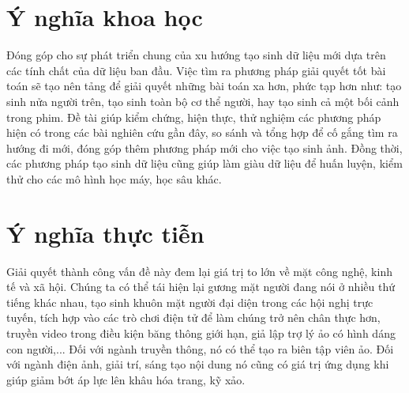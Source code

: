 \section{\texorpdfstring{Ý nghĩa khoa học}{ScientificMeaning}}
Đóng góp cho sự phát triển chung của xu hướng tạo sinh dữ liệu mới dựa trên các tính chất của dữ liệu ban đầu. Việc tìm ra phương pháp giải quyết tốt bài toán sẽ tạo nên tảng để giải quyết những bài toán xa hơn, phức tạp hơn như: tạo sinh nửa người trên, tạo sinh toàn bộ cơ thể người, hay tạo sinh cả một bối cảnh trong phim. Đề tài giúp kiểm chứng, hiện thực, thử nghiệm các phương pháp hiện có trong các bài nghiên cứu gần đây, so sánh và tổng hợp để cố gắng tìm ra hướng đi mới, đóng góp thêm phương pháp mới cho việc tạo sinh ảnh. Đồng thời, các phương pháp tạo sinh dữ liệu cũng giúp làm giàu dữ liệu để huấn luyện, kiểm thử cho các mô hình học máy, học sâu khác.

\section{\texorpdfstring{Ý nghĩa thực tiễn}{RealLifeMeaning}}
Giải quyết thành công vấn đề này đem lại giá trị to lớn về mặt công nghệ, kinh tế và xã hội. Chúng ta có thể tái hiện lại gương mặt người đang nói ở nhiều thứ tiếng khác nhau, tạo sinh khuôn mặt người đại diện trong các hội nghị trực tuyến, tích hợp vào các trò chơi điện tử để làm chúng trở nên chân thực hơn, truyền video trong điều kiện băng thông giới hạn, giả lập trợ lý ảo có hình dáng con người,... Đối với ngành truyền thông, nó có thể tạo ra biên tập viên ảo. Đối với ngành điện ảnh, giải trí, sáng tạo nội dung nó cũng có giá trị ứng dụng khi giúp giảm bớt áp lực lên khâu hóa trang, kỹ xảo.
